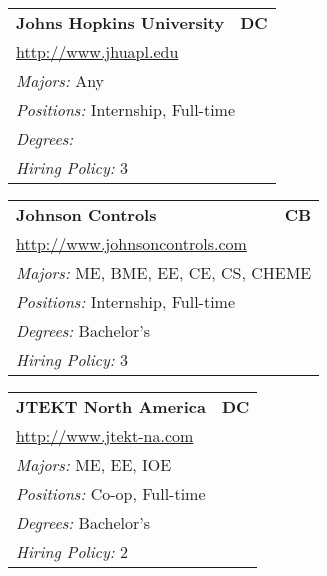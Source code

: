 \documentclass[twoside]{article}
\begin{document}
\begin{center}
\begin{multicols}{3}
\begin{FlushLeft}
\begin{minipage}{.9\columnwidth}
\end{minipage}
 
\begin{minipage}{.9\columnwidth}\begin{tabularx}{.95\columnwidth}{Xr}
                 {\Large\bf Johns Hopkins University} & {\Large\bf DC}\\
    \multicolumn{2}{p{.95\columnwidth}}{\url{http://www.jhuapl.edu}}\\
    \multicolumn{2}{p{.95\columnwidth}}{\emph{Majors:} Any}\\
    \multicolumn{2}{p{.95\columnwidth}}{\emph{Positions:} Internship, Full-time}\\
    \multicolumn{2}{p{.95\columnwidth}}{\emph{Degrees:} }\\
    \multicolumn{2}{p{.95\columnwidth}}{\emph{Hiring Policy:} 3}\\
    \end{tabularx}
    
\end{minipage}
 
\begin{minipage}{.9\columnwidth}\begin{tabularx}{.95\columnwidth}{Xr}
                 {\Large\bf Johnson Controls} & {\Large\bf CB}\\
    \multicolumn{2}{p{.95\columnwidth}}{\url{http://www.johnsoncontrols.com}}\\
    \multicolumn{2}{p{.95\columnwidth}}{\emph{Majors:} ME, BME, EE, CE, CS, CHEME}\\
    \multicolumn{2}{p{.95\columnwidth}}{\emph{Positions:} Internship, Full-time}\\
    \multicolumn{2}{p{.95\columnwidth}}{\emph{Degrees:} Bachelor's}\\
    \multicolumn{2}{p{.95\columnwidth}}{\emph{Hiring Policy:} 3}\\
    \end{tabularx}
    
\end{minipage}
 
\begin{minipage}{.9\columnwidth}\begin{tabularx}{.95\columnwidth}{Xr}
                 {\Large\bf JTEKT North America} & {\Large\bf DC}\\
    \multicolumn{2}{p{.95\columnwidth}}{\url{http://www.jtekt-na.com}}\\
    \multicolumn{2}{p{.95\columnwidth}}{\emph{Majors:} ME, EE, IOE}\\
    \multicolumn{2}{p{.95\columnwidth}}{\emph{Positions:} Co-op, Full-time}\\
    \multicolumn{2}{p{.95\columnwidth}}{\emph{Degrees:} Bachelor's}\\
    \multicolumn{2}{p{.95\columnwidth}}{\emph{Hiring Policy:} 2}\\
    \end{tabularx}
    

\end{minipage}
\end{FlushLeft}
\end{multicols}
\end{center}
\end{document}
